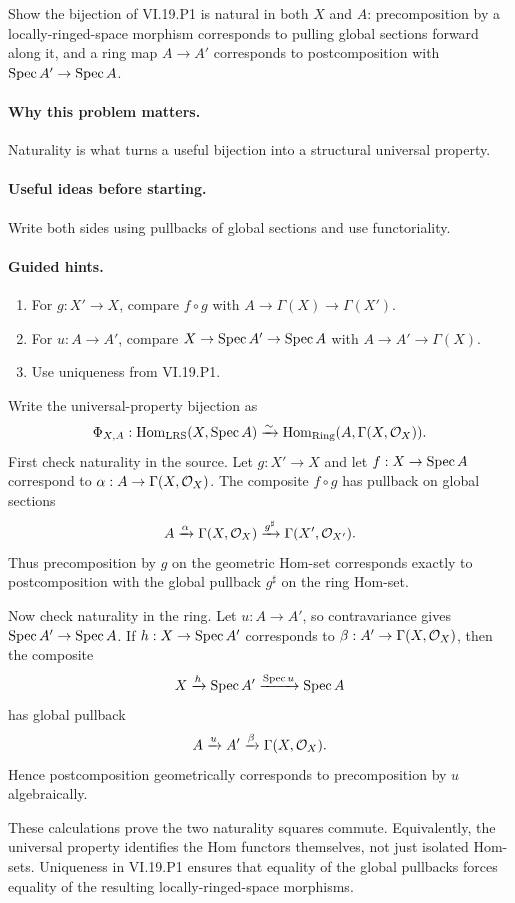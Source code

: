 \begin{problem}\label{prob:vi19-p20}
Show the bijection of VI.19.P1 is natural in both $X$ and $A$: precomposition by a locally-ringed-space morphism corresponds to pulling global sections forward along it, and a ring map $A\to A'$ corresponds to postcomposition with $\operatorname{Spec} A'\to\operatorname{Spec} A$.
\end{problem}

\ifdefined\FullProblemDossiers
\paragraph{Why this problem matters.}
Naturality is what turns a useful bijection into a structural universal property.

\paragraph{Useful ideas before starting.}
Write both sides using pullbacks of global sections and use functoriality.

\paragraph{Guided hints.}
\begin{enumerate}
\item For $g:X'\to X$, compare $f\circ g$ with $A\to\Gamma(X)\to\Gamma(X')$.
\item For $u:A\to A'$, compare $X\to\operatorname{Spec} A'\to\operatorname{Spec} A$ with $A\to A'\to\Gamma(X)$.
\item Use uniqueness from VI.19.P1.
\end{enumerate}

\begin{solution}
Write the universal-property bijection as
\[
\Phi_{X,A}:\operatorname{Hom}_{\mathrm{LRS}}(X,\operatorname{Spec} A)
\xrightarrow{\sim}
\operatorname{Hom}_{\mathrm{Ring}}(A,\Gamma(X,\mathcal O_X)).
\]
First check naturality in the source.  Let \(g:X'\to X\) and let \(f:X\to\operatorname{Spec} A\) correspond to \(\alpha:A\to\Gamma(X,\mathcal O_X)\).  The composite \(f\circ g\) has pullback on global sections
\[
A\xrightarrow{\alpha}\Gamma(X,\mathcal O_X)
\xrightarrow{g^\sharp}\Gamma(X',\mathcal O_{X'}).
\]
Thus precomposition by \(g\) on the geometric Hom-set corresponds exactly to postcomposition with the global pullback \(g^\sharp\) on the ring Hom-set.

Now check naturality in the ring.  Let \(u:A\to A'\), so contravariance gives \(\operatorname{Spec} A'\to\operatorname{Spec} A\).  If \(h:X\to\operatorname{Spec} A'\) corresponds to \(\beta:A'\to\Gamma(X,\mathcal O_X)\), then the composite
\[
X\xrightarrow{h}\operatorname{Spec} A'\xrightarrow{\operatorname{Spec} u}\operatorname{Spec} A
\]
has global pullback
\[
A\xrightarrow{u}A'\xrightarrow{\beta}\Gamma(X,\mathcal O_X).
\]
Hence postcomposition geometrically corresponds to precomposition by \(u\) algebraically.

These calculations prove the two naturality squares commute.  Equivalently, the universal property identifies the Hom functors themselves, not just isolated Hom-sets.  Uniqueness in VI.19.P1 ensures that equality of the global pullbacks forces equality of the resulting locally-ringed-space morphisms.
\end{solution}

